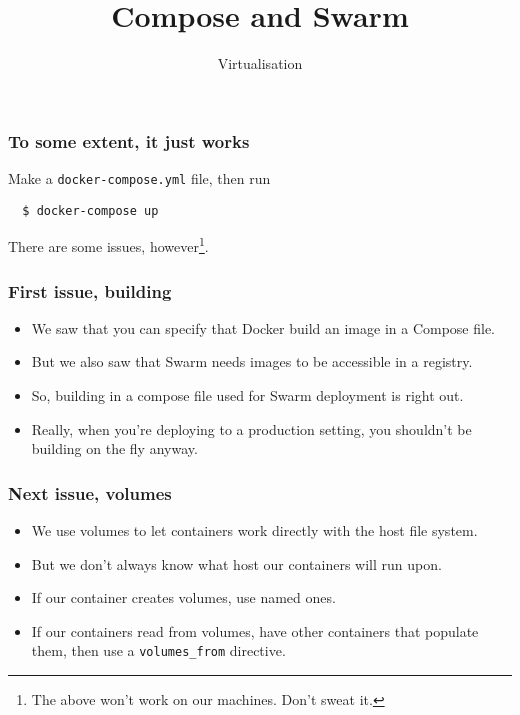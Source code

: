 \documentclass[10pt]{beamer}
\title{Compose and Swarm}
\author[I720]{Virtualisation}
\institute[Otago Polytechnic]{
  Otago Polytechnic \\
  Dunedin, New Zealand \\
}
\date{}
\begin{document}
\begin{frame}[plain]
  \titlepage
\end{frame}

\begin{frame}[fragile]
  \frametitle{To some extent, it just works}
  
  Make a \texttt{docker-compose.yml} file, then run
  
  \begin{verbatim}
  $ docker-compose up
   \end{verbatim}
   
   There are some issues, however\footnote{The above won't work on our machines.  Don't sweat it.}.
\end{frame}

\begin{frame}
  \frametitle{First issue, building}
   
   \begin{itemize}
     \item We saw that you can specify that Docker build an image in a Compose file.
     \item But we also saw that Swarm needs images to be accessible in a registry.
     \item So, building in a compose file used for Swarm deployment is right out.
     \item Really, when you're deploying to a production setting, you shouldn't be building on the fly anyway.
   \end{itemize}
\end{frame}

\begin{frame}
  \frametitle{Next issue, volumes}
   
   \begin{itemize}
     \item We use volumes to let containers work directly with the host file system.
     \item But we don't always know what host our containers will run upon.
     \item If our container creates volumes, use named ones.
     \item If our containers read from volumes, have other containers that populate them, then use a \texttt{volumes\_from} directive.
   \end{itemize}
\end{frame}
\end{document}
